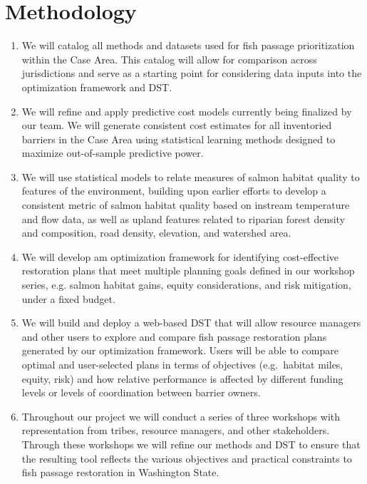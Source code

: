 \documentclass[12pt]{elsarticle}
\begin{document}
		\section{Methodology} 
			\begin{enumerate}
				\item We will catalog all methods and datasets used for fish passage prioritization within the Case Area. This catalog will allow for comparison across jurisdictions and serve as a starting point for considering data inputs into the optimization framework and DST.
				\item We will refine and apply predictive cost models currently being finalized by our team. We will generate consistent cost estimates for all inventoried barriers in the Case Area using statistical learning methods designed to maximize out-of-sample predictive power.
				\item We will use statistical models to relate measures of salmon habitat quality to features of the environment, building upon earlier efforts to develop a consistent metric of salmon habitat quality based on instream temperature and flow data, as well as upland features related to riparian forest density and composition, road density, elevation, and watershed area.
				\item We will develop am optimization framework for identifying cost-effective restoration plans that meet multiple planning
				goals defined in our workshop series, e.g. salmon habitat gains, equity considerations, and risk mitigation, under a fixed budget.
				\item We will build and deploy a web-based DST that will allow resource managers and other users to explore and compare fish passage restoration plans generated by our optimization framework. Users will be able to compare optimal and user-selected plans in terms of objectives (e.g.\ habitat miles, equity, risk) and how relative performance is affected by different funding levels or levels of coordination between barrier owners.
				\item Throughout our project we will conduct a series of three workshops with representation from tribes, resource managers, and other stakeholders. Through these workshops we will refine our methods and DST to ensure that the resulting tool reflects the various objectives and practical constraints to fish passage restoration in Washington State.
			\end{enumerate}
\end{document}
